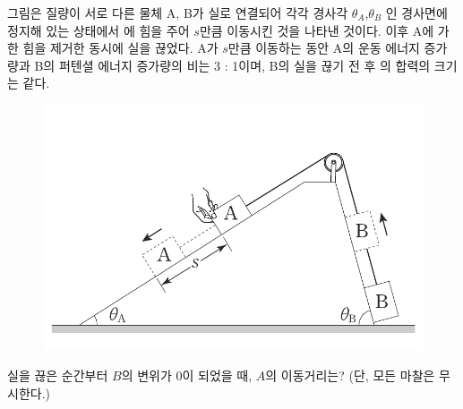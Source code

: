 \documentclass{oblivoir}
\begin{document}
  그림은 질량이 서로 다른 물체 A, B가 실로 연결되어 각각 경사각 $\theta_A$,$\theta_B$ 인 경사면에 정지해 있는 상태에서 에 힘을 주어 $s$만큼 이동시킨 것을 나타낸 것이다. 이후 A에 가한 힘을 제거한 동시에 실을 끊었다. A가 $s$만큼 이동하는 동안 A의 운동 에너지 증가량과 B의 퍼텐셜 에너지 증가량의 비는 3 : 1이며, B의 실을 끊기 전 후 의 합력의 크기는 같다. 
\begin{figure}[h!]
    \centering
    \includegraphics[scale =0.5]{180820.PNG}
    \label{fig:my_label}
\end{figure}


실을 끊은 순간부터 $B$의 변위가 0이 되었을 때, $A$의 이동거리는? (단, 모든 마찰은 무시한다.)
\end{document}
